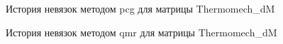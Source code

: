 \begin{figure}[H]
    \renewcommand{\figurename}{Рисунок}
    \caption{История невязок методом pcg для матрицы Thermomech_dM}
    \label{fig:image_29}
\end{figure}

\begin{figure}[H]
    \renewcommand{\figurename}{Рисунок}
    \caption{История невязок методом qmr для матрицы Thermomech_dM}
    \label{fig:image_30}
\end{figure}

